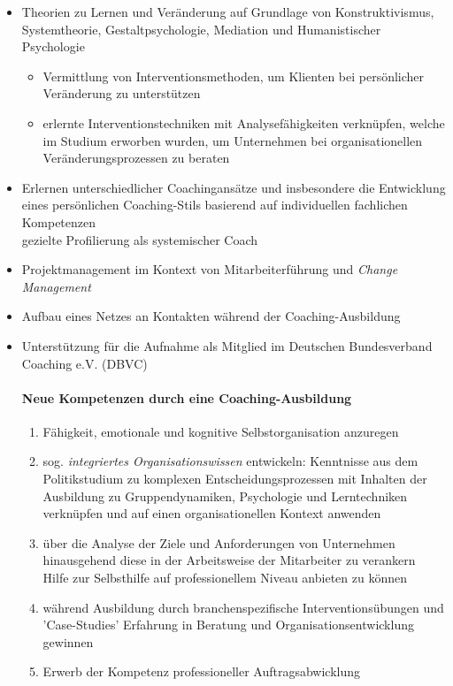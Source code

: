 \documentclass[11pt,a4paper]{article}
\begin{document}
\begin{itemize}

\item Theorien zu Lernen und Veränderung auf Grundlage von Konstruktivismus, Systemtheorie, Gestaltpsychologie, Mediation und Humanistischer Psychologie

	\begin{itemize}
		\item Vermittlung von Interventionsmethoden, um Klienten bei persönlicher Veränderung zu unterstützen
		\item erlernte Interventionstechniken mit Analysefähigkeiten verknüpfen, welche im Studium erworben wurden, um Unternehmen bei organisationellen Veränderungsprozessen zu beraten
	\end{itemize}


\item Erlernen unterschiedlicher Coachingansätze und insbesondere die Entwicklung eines persönlichen Coaching-Stils basierend auf individuellen fachlichen Kompetenzen\\
 gezielte Profilierung als systemischer Coach

\item Projektmanagement im Kontext von Mitarbeiterführung und \textsl{Change Management}

\item Aufbau eines Netzes an Kontakten während der Coaching-Ausbildung

\item Unterstützung für die Aufnahme als Mitglied im Deutschen Bundesverband Coaching e.V. (DBVC)


\paragraph*{\textsf{Neue Kompetenzen durch eine Coaching-Ausbildung}}

\begin{enumerate}
\item Fähigkeit, emotionale und kognitive Selbstorganisation anzuregen
\item sog. \textsl{integriertes Organisationswissen} entwickeln: Kenntnisse aus dem Politikstudium zu komplexen Entscheidungsprozessen mit Inhalten der Ausbildung zu Gruppendynamiken, Psychologie und Lerntechniken verknüpfen und auf einen organisationellen Kontext anwenden
\item über die Analyse der Ziele und Anforderungen von Unternehmen hinausgehend diese in der Arbeitsweise der Mitarbeiter zu verankern\\
 Hilfe zur Selbsthilfe auf professionellem Niveau anbieten zu können
\item während Ausbildung durch branchenspezifische Interventionsübungen und 'Case-Studies' Erfahrung in Beratung und Organisationsentwicklung gewinnen
\item Erwerb der Kompetenz professioneller Auftragsabwicklung
\end{enumerate}

\end{itemize}
\end{document}
